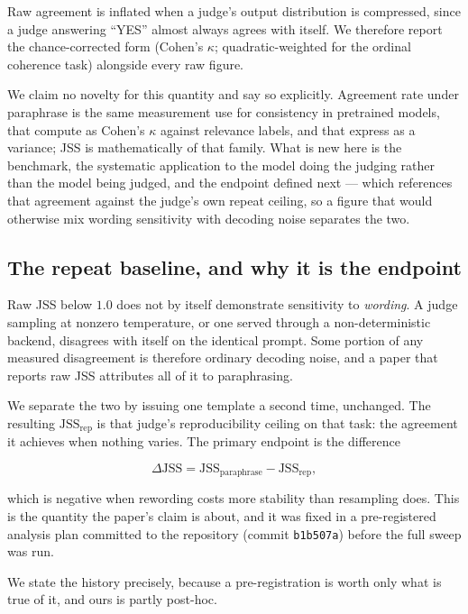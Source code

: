 \documentclass[11pt]{article}          %
\begin{document}
Raw agreement is inflated when a judge's output distribution is compressed, since
a judge answering ``YES'' almost always agrees with itself. We therefore report
the chance-corrected form (Cohen's $\kappa$; quadratic-weighted for the
ordinal coherence task) alongside every raw figure.

We claim no novelty for this quantity and say so explicitly. Agreement rate under
paraphrase is the same measurement \citet{elazar2021measuring} use for consistency
in pretrained models, that \citet{arabzadeh2025human} compute as Cohen's $\kappa$
against relevance labels, and that \citet{zhuo2024prosa} express as a variance;
JSS is mathematically of that family. What is new here is the benchmark, the
systematic application to the model doing the judging rather than the model being
judged, and the endpoint defined next --- which references that agreement against
the judge's own repeat ceiling, so a figure that would otherwise mix wording
sensitivity with decoding noise separates the two.

\subsection{The repeat baseline, and why it is the endpoint}
\label{sec:repeat}

Raw JSS below $1.0$ does not by itself demonstrate sensitivity to \emph{wording}.
A judge sampling at nonzero temperature, or one served through a
non-deterministic backend, disagrees with itself on the identical prompt. Some
portion of any measured disagreement is therefore ordinary decoding noise, and a
paper that reports raw JSS attributes all of it to paraphrasing.

We separate the two by issuing one template a second time, unchanged. The
resulting $\mathrm{JSS}_{\text{rep}}$ is that judge's reproducibility ceiling on
that task: the agreement it achieves when nothing varies. The primary endpoint is
the difference

\[
  \Delta\mathrm{JSS} = \mathrm{JSS}_{\text{paraphrase}} - \mathrm{JSS}_{\text{rep}},
\]

which is negative when rewording costs more stability than resampling does. This
is the quantity the paper's claim is about, and it was fixed in a pre-registered
analysis plan committed to the repository (commit \texttt{b1b507a}) before the
full sweep was run.

We state the history precisely, because a pre-registration is worth only what is
true of it, and ours is partly post-hoc.
\end{document}
